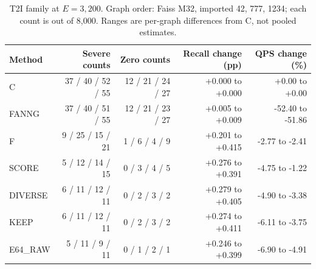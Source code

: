 \begin{table}[t]
\centering
\caption{T2I family at $E=3{,}200$. Graph order: Faiss M32, imported 42, 777, 1234; each count is out of 8,000. Ranges are per-graph differences from C, not pooled estimates.}
\label{tab:family}
\small
\begin{tabular}{@{}lrrrr@{}}
\toprule
Method & Severe counts & Zero counts & Recall change (pp) & QPS change (\%) \\
\midrule
C & 37 / 40 / 52 / 55 & 12 / 21 / 24 / 27 & +0.000 to +0.000 & +0.00 to +0.00 \\
FANNG & 37 / 40 / 51 / 55 & 12 / 21 / 23 / 27 & +0.005 to +0.009 & -52.40 to -51.86 \\
F & 9 / 25 / 15 / 21 & 1 / 6 / 4 / 9 & +0.201 to +0.415 & -2.77 to -2.41 \\
SCORE & 5 / 12 / 14 / 15 & 0 / 3 / 4 / 5 & +0.276 to +0.391 & -4.75 to -1.22 \\
DIVERSE & 6 / 11 / 12 / 11 & 0 / 2 / 3 / 2 & +0.279 to +0.405 & -4.90 to -3.38 \\
KEEP & 6 / 11 / 12 / 11 & 0 / 2 / 3 / 2 & +0.274 to +0.411 & -6.11 to -3.75 \\
E64\_RAW & 5 / 11 / 9 / 11 & 0 / 1 / 2 / 1 & +0.246 to +0.399 & -6.90 to -4.91 \\
\bottomrule
\end{tabular}
\end{table}
